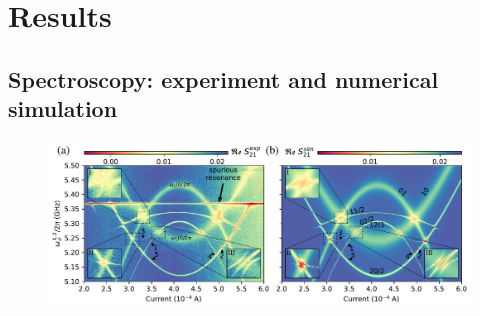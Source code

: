 \documentclass[%
 aps, prx,
 amsmath,amssymb,
 reprint,%
superscriptaddress
]{revtex4-2}
\begin{document}
\section{Results}

\subsection{\label{sec:level1} Spectroscopy: experiment and numerical simulation}

\begin{figure}
	
	\centering
	\includegraphics[width=\linewidth]{main_picture}
	

\end{figure}
\end{document}
